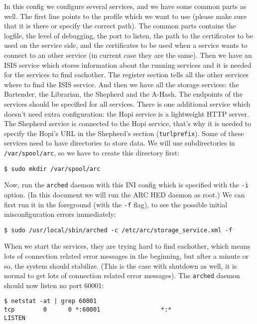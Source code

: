 \documentclass{article}
\begin{document}
In this config we configure several services, and we have some common parts as well. The first line points to the profile which we want to use (please make sure that it is there or specify the correct path). The common parts contains the logfile, the level of debugging, the port to listen, the path to the certificates to be used on the service side, and the certificates to be used when a service wants to connect to an other service (in current case they are the same). Then we have an ISIS service which stores information about the running services and it is needed for the services to find eachother. The register section tells all the other services where to find the ISIS service. And then we have all the storage services: the Bartender, the Librarian, the Shepherd and the A-Hash. The endpoints of the services should be specified for all services. There is one additional service which doesn't need extra configuration: the Hopi service is a lightweight HTTP server. The Shepherd service is connected to the Hopi service, that's why it is needed to specify the Hopi's URL in the Shepherd's section (\verb!turlprefix!). Some of these services need to have directories to store data. We will use subdirectories in \verb!/var/spool/arc!, so we have to create this directory first:

\begin{verbatim}
$ sudo mkdir /var/spool/arc
\end{verbatim}

Now, run the \verb!arched! daemon with this INI config which is specified with the \verb!-i! option. (In this document we will run the ARC HED daemon as root.) We can first run it in the foreground (with the \verb!-f! flag), to see the possible initial misconfiguration errors immediately:

\begin{verbatim}
$ sudo /usr/local/sbin/arched -c /etc/arc/storage_service.xml -f
\end{verbatim}

When we start the services, they are trying hard to find eachother, which means lots of connection related error messages in the beginning, but after a minute or so, the system should stabilize. (This is the case with shutdown as well, it is normal to get lots of connection related error messages). The \verb!arched! daemon should now listen no port 60001:

\begin{verbatim}
$ netstat -at | grep 60001
tcp        0      0 *:60001                 *:*                     LISTEN     
\end{verbatim}
\end{document}
